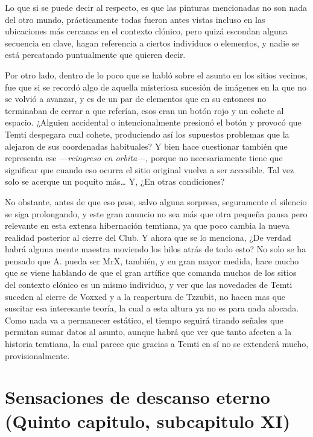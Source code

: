 \documentclass[
  spanish,
]{book}
\begin{document}
Lo que si se puede decir al respecto, es que las pinturas mencionadas no son nada del otro mundo, prácticamente todas fueron antes vistas incluso en las ubicaciones más cercanas en el contexto clónico, pero quizá escondan alguna secuencia en clave, hagan referencia a ciertos individuos o elementos, y nadie se está percatando puntualmente que quieren decir.

Por otro lado, dentro de lo poco que se habló sobre el asunto en los sitios vecinos, fue que si se recordó algo de aquella misteriosa sucesión de imágenes en la que no se volvió a avanzar, y es de un par de elementos que en su entonces no terminaban de cerrar a que referían, esos eran un botón rojo y un cohete al espacio. ¿Alguien accidental o intencionalmente presionó el botón y provocó que Temti despegara cual cohete, produciendo así los supuestos problemas que la alejaron de sus coordenadas habituales?
Y bien hace cuestionar también que representa ese \emph{---reingreso en orbita---}, porque no necesariamente tiene que significar que cuando eso ocurra el sitio original vuelva a ser accesible. Tal vez solo se acerque un poquito más\ldots{} Y, ¿En otras condiciones?

No obstante, antes de que eso pase, salvo alguna sorpresa, seguramente el silencio se siga prolongando, y este gran anuncio no sea más que otra pequeña pausa pero relevante en esta extensa hibernación temtiana, ya que poco cambia la nueva realidad posterior al cierre del Club.
Y ahora que se lo menciona, ¿De verdad habrá alguna mente maestra moviendo los hilos atrás de todo esto?
No solo se ha pensado que A. pueda ser MrX, también, y en gran mayor medida, hace mucho que se viene hablando de que el gran artífice que comanda muchos de los sitios del contexto clónico es un mismo individuo, y ver que las novedades de Temti suceden al cierre de Voxxed y a la reapertura de Tzzubit, no hacen mas que suscitar esa interesante teoría, la cual a esta altura ya no es para nada alocada. Como nada va a permanecer estático, el tiempo seguirá tirando señales que permitan sumar datos al asunto, aunque habrá que ver que tanto afecten a la historia temtiana, la cual parece que gracias a Temti en sí no se extenderá mucho, provisionalmente.

\hypertarget{sensaciones-de-descanso-eterno-quinto-capitulo-subcapitulo-xi}{%
\section{Sensaciones de descanso eterno (Quinto capitulo, subcapitulo XI)}\label{sensaciones-de-descanso-eterno-quinto-capitulo-subcapitulo-xi}}
\end{document}
